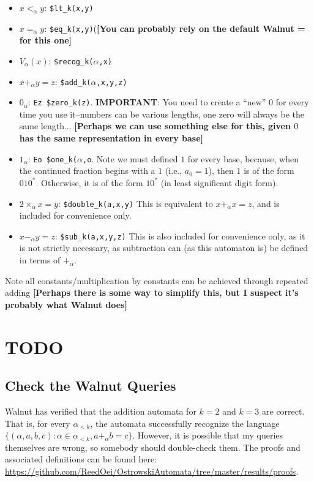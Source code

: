 \documentclass{article}
\theoremstyle{definition}
\theoremstyle{remark}
\theoremstyle{remark}
\theoremstyle{plain}
\theoremstyle{definition}
\newcommand{\reed}[1]{{\color{magenta}\bfseries [#1]}}
\begin{document}
\begin{itemize}
    \item $x <_{\alpha} y$: \texttt{\$lt\_k(x,y)}
    \item $x =_{\alpha} y$: \texttt{\$eq\_k(x,y)}(\reed{You can probably rely on the default Walnut = for this one}
    \item $V_{\alpha}(x)$: \texttt{\$recog\_k($\alpha$,x)}
    \item $x +_{\alpha} y = z$: \texttt{\$add\_k($\alpha$,x,y,z)}
    \item $0_{\alpha}$: \texttt{Ez \$zero\_k(z)}. \textbf{IMPORTANT}: You need to create a ``new'' 0 for every time you use it--numbers can be various lengths, one zero will always be the same length... \reed{Perhaps we can use something else for this, given $0$ has the same representation in every base}
    \item $1_{\alpha}$: \texttt{Eo \$one\_k($\alpha$,o}. Note we must defined $1$ for every base, because, when the continued fraction begins with a $1$ (i.e., $a_0 = 1$), then $1$ is of the form $010^*$.
    Otherwise, it is of the form $10^*$ (in least significant digit form).
    \item $2 \times_{\alpha} x = y$: \texttt{\$double\_k(a,x,y)} This is equivalent to $x +_{\alpha} x = z$, and is included for convenience only.
    \item $x -_{\alpha} y = z$: \texttt{\$sub\_k(a,x,y,z)} This is also included for convenience only, as it is not strictly necessary, as subtraction can (as this automaton is) be defined in terms of $+_{\alpha}$.
\end{itemize}

Note all constants/multiplication by constants can be achieved through repeated adding \reed{Perhaps there is some way to simplify this, but I suspect it's probably what Walnut does}

\section{TODO}
\subsection{Check the Walnut Queries}
Walnut has verified that the addition automata for $k = 2$ and $k = 3$ are correct.
That is, for every $\alpha_{< k}$, the automata successfully recognize the language $\{(\alpha,a,b,c) : \alpha \in \alpha_{< k}, a +_{\alpha} b = c \}$.
However, it is possible that my queries themselves are wrong, so somebody should double-check them.
The proofs and associated definitions can be found here: \url{https://github.com/ReedOei/OstrowskiAutomata/tree/master/results/proofs}.
\end{document}
